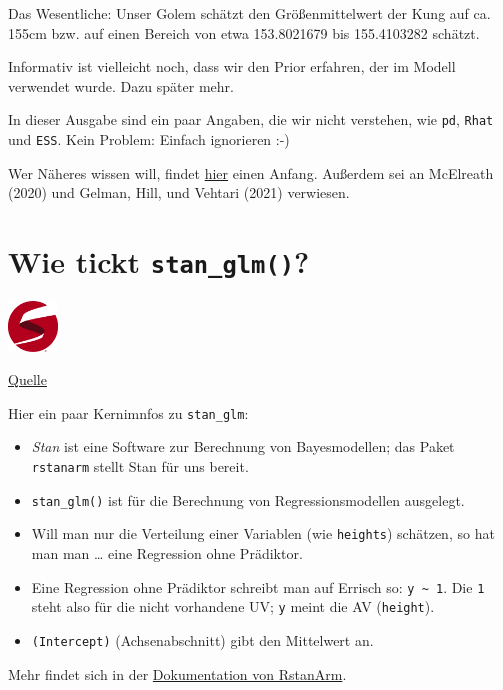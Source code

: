 \documentclass[
  a4paper,
  DIV=11]{scrreprt}
\providecommand{\tightlist}{%
  \setlength{\itemsep}{0pt}\setlength{\parskip}{0pt}}\usepackage{longtable,booktabs,array}
\theoremstyle{definition}
\theoremstyle{remark}
\begin{document}
Das Wesentliche: Unser Golem schätzt den Größenmittelwert der Kung auf
ca. 155cm bzw. auf einen Bereich von etwa 153.8021679 bis 155.4103282
schätzt.

Informativ ist vielleicht noch, dass wir den Prior erfahren, der im
Modell verwendet wurde. Dazu später mehr.

In dieser Ausgabe sind ein paar Angaben, die wir nicht verstehen, wie
\texttt{pd}, \texttt{Rhat} und \texttt{ESS}. Kein Problem: Einfach
ignorieren :-)

Wer Näheres wissen will, findet \href{}{hier} einen Anfang. Außerdem sei
an McElreath (2020) und Gelman, Hill, und Vehtari (2021) verwiesen.

\hypertarget{wie-tickt-stan_glm}{%
\section{\texorpdfstring{Wie tickt
\texttt{stan\_glm()}?}{Wie tickt stan\_glm()?}}\label{wie-tickt-stan_glm}}

\includegraphics[width=0.1\textwidth,height=\textheight]{./img/stanlogo.png}

\href{https://mc-stan.org/}{Quelle}

Hier ein paar Kernimnfos zu \texttt{stan\_glm}:

\begin{itemize}
\tightlist
\item
  \emph{Stan} ist eine Software zur Berechnung von Bayesmodellen; das
  Paket \texttt{rstanarm} stellt Stan für uns bereit.
\item
  \texttt{stan\_glm()} ist für die Berechnung von Regressionsmodellen
  ausgelegt.
\item
  Will man nur die Verteilung einer Variablen (wie \texttt{heights})
  schätzen, so hat man man \ldots{} eine Regression ohne Prädiktor.
\item
  Eine Regression ohne Prädiktor schreibt man auf Errisch so:
  \texttt{y\ \textasciitilde{}\ 1}. Die \texttt{1} steht also für die
  nicht vorhandene UV; \texttt{y} meint die AV (\texttt{height}).
\item
  \texttt{(Intercept)} (Achsenabschnitt) gibt den Mittelwert an.
\end{itemize}

Mehr findet sich in der
\href{https://mc-stan.org/rstanarm/}{Dokumentation von RstanArm}.
\end{document}
